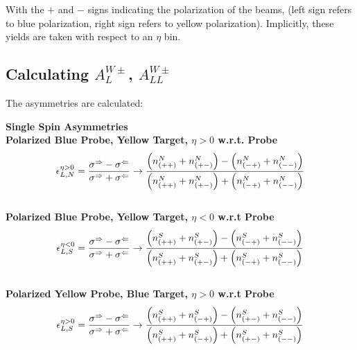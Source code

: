 With the $+$ and $-$ signs indicating the polarization of the beams, (left sign
refers to blue polarization, right sign refers to yellow polarization).
Implicitly, these yields are taken with respect to an $\eta$ bin.

\clearpage
\subsection{Calculating $A_L^{W\pm}$, $A_{LL}^{W\pm}$}
\label{sec:calculating_al}

The asymmetries are calculated:

\noindent\textbf{Single Spin Asymmetries}\\

\noindent\textbf{Polarized Blue Probe, Yellow Target, $\eta > 0$ w.r.t. Probe}
\begin{equation}
  {\epsilon_{L,N}^{\eta > 0}} 
  = 
  { 
    {\sigma^\Rightarrow-\sigma^\Leftarrow} 
    \over 
    {\sigma^\Rightarrow+\sigma^\Leftarrow} 
  } 
  \to 
  {
    {\left(n_{(++)}^N+n_{(+-)}^N\right)-\left(n_{(-+)}^N+n_{(--)}^N\right)}
    \over
    {\left(n_{(++)}^N+n_{(+-)}^N\right)+\left(n_{(-+)}^N+n_{(--)}^N\right)}
  }
  \label{eq:al_blue_probe_pos_rap}
\end{equation}\\

\noindent\textbf{Polarized Blue Probe, Yellow Target, $\eta < 0$ w.r.t Probe}
\begin{equation}
  {\epsilon_{L,S}^{\eta < 0}} 
  = 
  { 
    {\sigma^\Rightarrow - \sigma^\Leftarrow} 
    \over 
    {\sigma^\Rightarrow + \sigma^\Leftarrow} 
  } 
  \to 
  {
    {\left(n_{(++)}^S+n_{(+-)}^S\right)-\left(n_{(-+)}^S+n_{(--)}^S\right)}
    \over
    {\left(n_{(++)}^S+n_{(+-)}^S\right)+\left(n_{(-+)}^S+n_{(--)}^S\right)}
  }
  \label{eq:al_blue_probe_neg_rap}
\end{equation}\\

\noindent\textbf{Polarized Yellow Probe, Blue Target, $\eta > 0$ w.r.t Probe}
\begin{equation}
  {\epsilon_{L,S}^{\eta > 0}} 
  = 
  { 
    {\sigma^\Rightarrow-\sigma^\Leftarrow} 
    \over 
    {\sigma^\Rightarrow+\sigma^\Leftarrow} 
  } 
  \to 
  {
    {\left(n_{(++)}^S+n_{(-+)}^S\right)-\left(n_{(+-)}^S+n_{(--)}^S\right)}
    \over
    {\left(n_{(++)}^S+n_{(-+)}^S\right)+\left(n_{(+-)}^S+n_{(--)}^S\right)}
  }
  \label{eq:al_yell_probe_pos_rap}
\end{equation}\\


